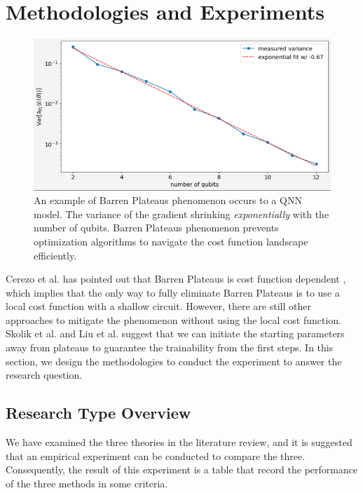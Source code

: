 \section{Methodologies and Experiments}
\begin{figure}
    \includegraphics[width=\textwidth]{./ResearchDesign/Appendices/VarianceShrinking.png}
    \caption{
        An example of Barren Plateaus phenomenon occurs to a QNN model. 
        The variance of the gradient shrinking \textit{exponentially} with the number of qubits. 
        Barren Plateaus phenomenon prevents optimization algorithms to navigate the cost function landscape efficiently.
    }
    \label{Variance Shrinking demo}
\end{figure}

Cerezo et al. has pointed out that Barren Plateaus is cost function dependent \cite{cerezoCostFunctionDependent2021}, which implies that the only way to fully eliminate Barren Plateaus is to use a local cost function with a shallow circuit.
However, there are still other approaches to mitigate the phenomenon without using the local cost function.
Skolik et al. and Liu et al. \cite{skolikLayerwiseLearningQuantum2021, liuParameterInitializationMethod2021} suggest that we can initiate the starting parameters away from plateaus to guarantee the trainability from the first steps.
In this section, we design the methodologies to conduct the experiment to answer the research question.

\subsection{Research Type Overview}
We have examined the three theories \cite{cerezoCostFunctionDependent2021, liuParameterInitializationMethod2021, skolikLayerwiseLearningQuantum2021} in the literature review, and it is suggested that an empirical experiment can be conducted to compare the three.
Consequently, the result of this experiment is a table that record the performance of the three methods in some criteria.


